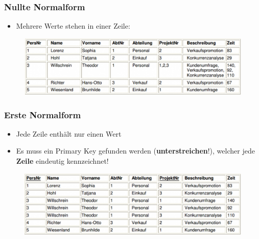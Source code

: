 \subsubsection{Nullte Normalform}
\begin{itemize}
    \item Mehrere Werte stehen in einer Zeile:
\end{itemize}
\begin{figure}[H]
    \centering
    \includegraphics[width=\textwidth]{res/themenkorb_3/normalization_pic1.png}
\end{figure}
\subsubsection{Erste Normalform}
\begin{itemize}
    \item Jede Zeile enthält nur einen Wert
    \item Es muss ein Primary Key gefunden werden (\textbf{unterstreichen}!), welcher jede \textbf{Zeile} eindeutig kennzeichnet!
\end{itemize}
\begin{figure}[H]
    \centering
    \includegraphics[width=\textwidth]{res/themenkorb_3/normalization_pic2.png}
\end{figure}
